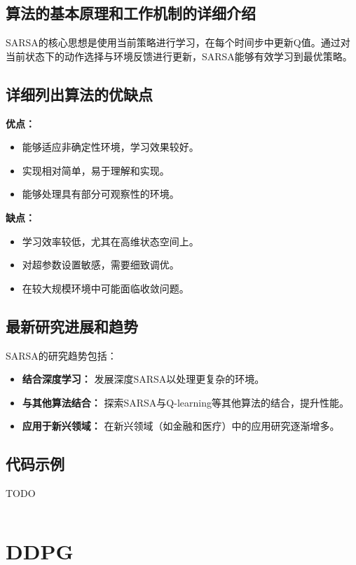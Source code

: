 \subsection*{算法的基本原理和工作机制的详细介绍}
SARSA的核心思想是使用当前策略进行学习，在每个时间步中更新Q值。通过对当前状态下的动作选择与环境反馈进行更新，SARSA能够有效学习到最优策略。

\subsection*{详细列出算法的优缺点}
\textbf{优点：}
\begin{itemize}
    \item 能够适应非确定性环境，学习效果较好。
    \item 实现相对简单，易于理解和实现。
    \item 能够处理具有部分可观察性的环境。
\end{itemize}

\textbf{缺点：}
\begin{itemize}
    \item 学习效率较低，尤其在高维状态空间上。
    \item 对超参数设置敏感，需要细致调优。
    \item 在较大规模环境中可能面临收敛问题。
\end{itemize}

\subsection*{最新研究进展和趋势}
SARSA的研究趋势包括：
\begin{itemize}
    \item \textbf{结合深度学习：} 发展深度SARSA以处理更复杂的环境。
    \item \textbf{与其他算法结合：} 探索SARSA与Q-learning等其他算法的结合，提升性能。
    \item \textbf{应用于新兴领域：} 在新兴领域（如金融和医疗）中的应用研究逐渐增多。
\end{itemize}
\subsection*{代码示例}
TODO
\begin{lstlisting}

\end{lstlisting}


\section{DDPG}
